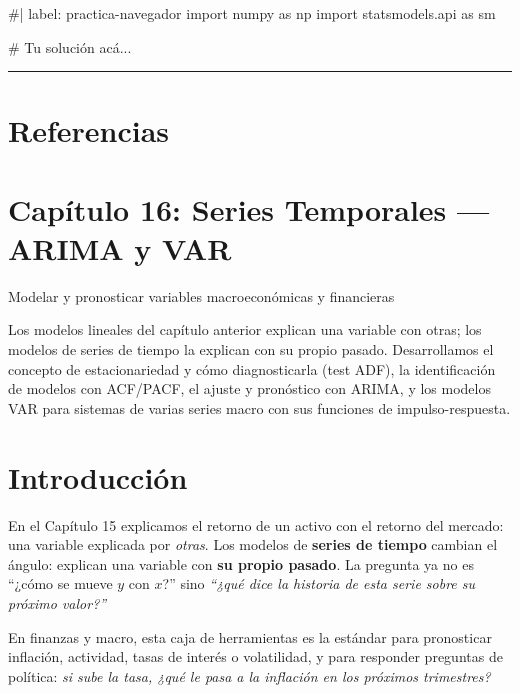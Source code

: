 \documentclass[
  spanish,
  letterpaper,
  DIV=11,
  numbers=noendperiod]{scrreprt}
\newenvironment{Shaded}{\begin{snugshade}}{\end{snugshade}}
\newcommand{\NormalTok}[1]{\textcolor[rgb]{0.00,0.23,0.31}{#1}}
\begin{document}
\begin{Shaded}
\begin{Highlighting}[]
\NormalTok{\#| label: practica{-}navegador}
\NormalTok{import numpy as np}
\NormalTok{import statsmodels.api as sm}

\NormalTok{\# Tu solución acá...}
\end{Highlighting}
\end{Shaded}

\begin{center}\rule{0.5\linewidth}{0.5pt}\end{center}

\chapter{Referencias}\label{referencias-14}

\label{refs}

\chapter{Capítulo 16: Series Temporales --- ARIMA y
VAR}\label{capuxedtulo-16-series-temporales-arima-y-var}

Modelar y pronosticar variables macroeconómicas y financieras

Los modelos lineales del capítulo anterior explican una variable con
otras; los modelos de series de tiempo la explican con su propio pasado.
Desarrollamos el concepto de estacionariedad y cómo diagnosticarla (test
ADF), la identificación de modelos con ACF/PACF, el ajuste y pronóstico
con ARIMA, y los modelos VAR para sistemas de varias series macro con
sus funciones de impulso-respuesta.

\hfill\break

\chapter{Introducción}\label{introducciuxf3n-13}

En el Capítulo 15 explicamos el retorno de un activo con el retorno del
mercado: una variable explicada por \emph{otras}. Los modelos de
\textbf{series de tiempo} cambian el ángulo: explican una variable con
\textbf{su propio pasado}. La pregunta ya no es ``¿cómo se mueve \(y\)
con \(x\)?'' sino \emph{``¿qué dice la historia de esta serie sobre su
próximo valor?''}

En finanzas y macro, esta caja de herramientas es la estándar para
pronosticar inflación, actividad, tasas de interés o volatilidad, y para
responder preguntas de política: \emph{si sube la tasa, ¿qué le pasa a
la inflación en los próximos trimestres?}
\end{document}

